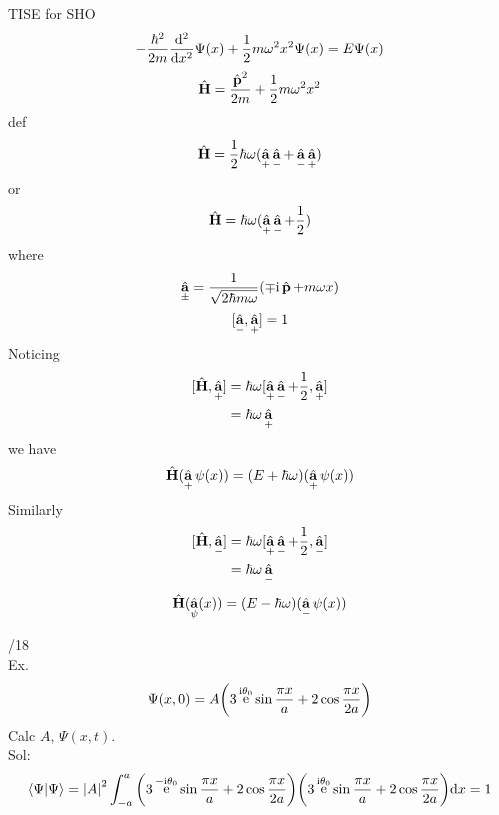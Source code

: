 \documentclass[UTF8]{ctexart} %
\DeclareMathOperator{\e}{\mathrm{e}}
\renewcommand{\I}{\mathrm{i}}
\DeclareMathOperator{\hH}{\hat{\vb{H}}}
\DeclareMathOperator{\hp}{\hat{\vb{p}}}
\DeclareMathOperator{\ha}{\hat{\vb{a}}}
\numberwithin{equation}{subsection}
\begin{document}
TISE for SHO
\begin{equation}\label{key}
-\dfrac{\hbar^2}{2m}\dv[2]{x}\Psi(x) + \dfrac{1}{2}m\omega^2 x^2\Psi(x) = E\Psi(x)
\end{equation}
\begin{equation}\label{key}
\hH = \dfrac{\hp^2}{2m} + \dfrac{1}{2}m\omega^2 x^2
\end{equation}
def
\begin{equation}\label{key}
\hH = \dfrac{1}{2}\hbar\omega (\ha_+ \ha_- + \ha_-\ha_+)
\end{equation}
or
\begin{equation}\label{key}
\hH = \hbar\omega(\ha_+\ha_- + \dfrac{1}{2})
\end{equation}
where
\begin{equation}\label{key}
\ha_\pm = \dfrac{1}{\sqrt{2\hbar m\omega}}(\mp\I \hp + m\omega x)
\end{equation}
\begin{equation}\label{key}
[\ha_-, \ha_+] = 1
\end{equation}
Noticing
\begin{equation}\label{key}
\begin{aligned}
[\hH,\ha_+] &= \hbar\omega[\ha_+\ha_- + \dfrac{1}{2}, \ha_+]\\
&= \hbar\omega\ha_+
\end{aligned}
\end{equation}
we have
\begin{equation}\label{key}
\hH(\ha_+\psi(x)) = (E+\hbar\omega)(\ha_+\psi(x))
\end{equation}
Similarly
\begin{equation}\label{key}
\begin{aligned}
[\hH,\ha_-] &= \hbar\omega[\ha_+\ha_- + \dfrac{1}{2}, \ha_-]\\
&= \hbar\omega\ha_-
\end{aligned}
\end{equation}
\begin{equation}\label{key}
\hH(\ha_\psi(x)) = (E - \hbar\omega)(\ha_-\psi(x))
\end{equation}


/18\\
Ex.
\begin{equation}\label{key}
\Psi(x,0) = A\qty(3\e^{\I\theta_0}\sin\dfrac{\pi x}{a} + 2\cos\dfrac{\pi x}{2a})
\end{equation}
Calc $ A $, $ \Psi(x,t) $.\\
Sol:
\begin{equation}\label{key}
\braket{\Psi}{\Psi} = \abs{A}^2\int_{-a}^a \qty(3\e^{-\I\theta_0}\sin\dfrac{\pi x}{a} + 2\cos\dfrac{\pi x}{2a})\qty(3\e^{\I\theta_0}\sin\dfrac{\pi x}{a} + 2\cos\dfrac{\pi x}{2a})\dd x = 1
\end{equation}
\end{document}
